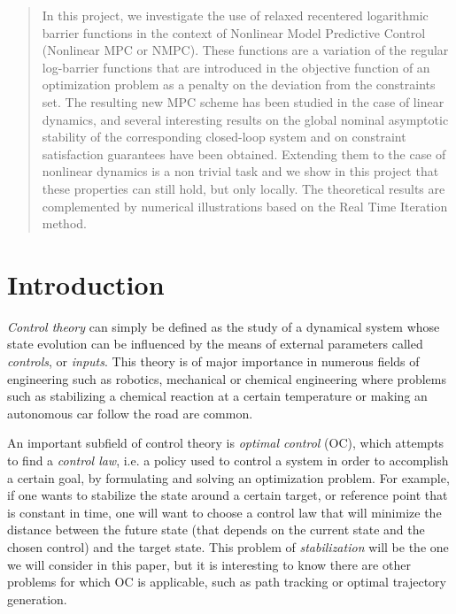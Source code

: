 \documentclass[12pt]{article}
\begin{document}


\clearpage
\thispagestyle{empty}
\tableofcontents

\clearpage
{}
\setcounter{page}{1}

{}
\setcounter{page}{1}

\begin{abstract}
	In this project, we investigate the use of relaxed recentered logarithmic barrier functions in the context of Nonlinear Model Predictive Control (Nonlinear MPC or NMPC).
	These functions are a variation of the regular log-barrier functions that are introduced in the objective function of an optimization problem as a penalty on the deviation from the constraints set.
	The resulting new MPC scheme has been studied in the case of linear dynamics, and several interesting results on the global nominal asymptotic stability of the corresponding closed-loop system and on constraint satisfaction guarantees have been obtained.
	Extending them to the case of nonlinear dynamics is a non trivial task and we show in this project that these properties can still hold, but only locally.
	The theoretical results are complemented by numerical illustrations based on the Real Time Iteration method.
\end{abstract}

\section{Introduction}
\textit{Control theory} can simply be defined as the study of a dynamical system whose state evolution can be influenced by the means of external parameters called \textit{controls}, or \textit{inputs}.
This theory is of major importance in numerous fields of engineering such as robotics, mechanical or chemical engineering where problems such as stabilizing a chemical reaction at a certain temperature or making an autonomous car follow the road are common.

An important subfield of control theory is \textit{optimal control} (OC), which attempts to find a \textit{control law}, i.e. a policy used to control a system in order to accomplish a certain goal, by formulating and solving an optimization problem.
For example, if one wants to stabilize the state around a certain target, or reference point that is constant in time, one will want to choose a control law that will minimize the distance between the future state (that depends on the current state and the chosen control) and the target state.
This problem of \textit{stabilization} will be the one we will consider in this paper, but it is interesting to know there are other problems for which OC is applicable, such as path tracking or optimal trajectory generation.
\end{document}
